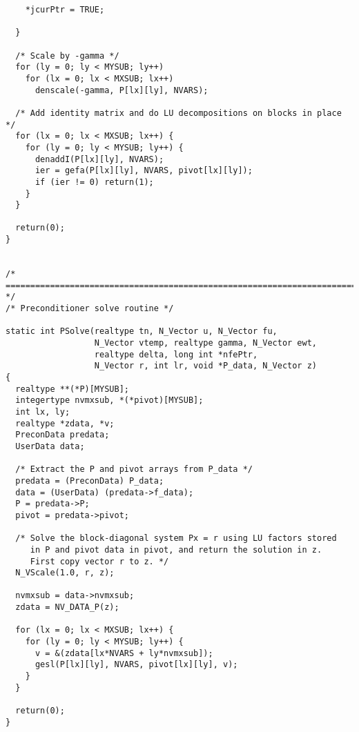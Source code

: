 \begin{verbatim}
    *jcurPtr = TRUE;

  }

  /* Scale by -gamma */
  for (ly = 0; ly < MYSUB; ly++)
    for (lx = 0; lx < MXSUB; lx++)
      denscale(-gamma, P[lx][ly], NVARS);
  
  /* Add identity matrix and do LU decompositions on blocks in place */
  for (lx = 0; lx < MXSUB; lx++) {
    for (ly = 0; ly < MYSUB; ly++) {
      denaddI(P[lx][ly], NVARS);
      ier = gefa(P[lx][ly], NVARS, pivot[lx][ly]);
      if (ier != 0) return(1);
    }
  }
  
  return(0);
}


/* ======================================================================= */
/* Preconditioner solve routine */

static int PSolve(realtype tn, N_Vector u, N_Vector fu, 
                  N_Vector vtemp, realtype gamma, N_Vector ewt, 
                  realtype delta, long int *nfePtr,
                  N_Vector r, int lr, void *P_data, N_Vector z)
{
  realtype **(*P)[MYSUB];
  integertype nvmxsub, *(*pivot)[MYSUB];
  int lx, ly;
  realtype *zdata, *v;
  PreconData predata;
  UserData data;

  /* Extract the P and pivot arrays from P_data */
  predata = (PreconData) P_data;
  data = (UserData) (predata->f_data);
  P = predata->P;
  pivot = predata->pivot;

  /* Solve the block-diagonal system Px = r using LU factors stored
     in P and pivot data in pivot, and return the solution in z.
     First copy vector r to z. */
  N_VScale(1.0, r, z);

  nvmxsub = data->nvmxsub;
  zdata = NV_DATA_P(z);

  for (lx = 0; lx < MXSUB; lx++) {
    for (ly = 0; ly < MYSUB; ly++) {
      v = &(zdata[lx*NVARS + ly*nvmxsub]);
      gesl(P[lx][ly], NVARS, pivot[lx][ly], v);
    }
  }

  return(0);
}
\end{verbatim}